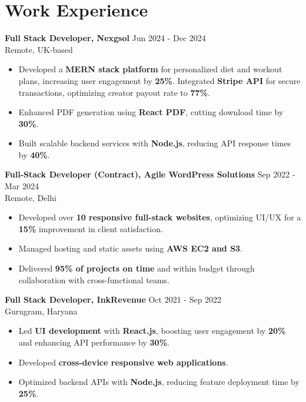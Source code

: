 \documentclass[a4paper,10pt]{article}
\begin{document}
\section*{\color{myblue} Work Experience}
\noindent
\textbf{Full Stack Developer, Nexgsol} \hfill Jun 2024 - Dec 2024 \\
Remote, UK-based  
\begin{itemize}
    \item Developed a \textbf{MERN stack platform} for personalized diet and workout plans, increasing user engagement by \textbf{25\%}. Integrated \textbf{Stripe API} for secure transactions, optimizing creator payout rate to \textbf{77\%}.
    \item Enhanced PDF generation using \textbf{React PDF}, cutting download time by \textbf{30\%}.
    \item Built scalable backend services with \textbf{Node.js}, reducing API response times by \textbf{40\%}.
\end{itemize}
\vspace{0.1em}
\noindent
\textbf{Full-Stack Developer (Contract), Agile WordPress Solutions} \hfill Sep 2022 - Mar 2024\\ 
Remote, Delhi
\begin{itemize}
    \item Developed over \textbf{10 responsive full-stack websites}, optimizing UI/UX for a \textbf{15\%} improvement in client satisfaction.
    \item Managed hosting and static assets using \textbf{AWS EC2 and S3}.
    \item Delivered \textbf{95\% of projects on time} and within budget through collaboration with cross-functional teams.
\end{itemize}
\vspace{0.1em}
\noindent
\textbf{Full Stack Developer, InkRevenue} \hfill Oct 2021 - Sep 2022 \\
Gurugram, Haryana  
\begin{itemize}
    \item Led \textbf{UI development} with \textbf{React.js}, boosting user engagement by \textbf{20\%} and enhancing API performance by \textbf{30\%}.
    \item Developed \textbf{cross-device responsive web applications}.
    \item Optimized backend APIs with \textbf{Node.js}, reducing feature deployment time by \textbf{25\%}.
\end{itemize}
\end{document}
